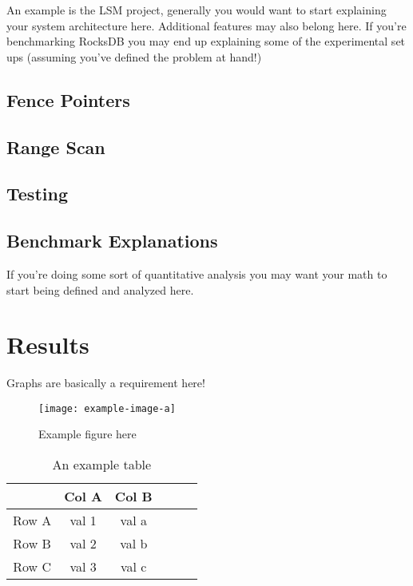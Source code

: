 \documentclass[sigconf]{acmart}
\begin{document}
An example is the LSM project, generally you would want to start explaining
your system architecture here. Additional features may also belong here. If
you're benchmarking RocksDB you may end up explaining some of the experimental
set ups (assuming you've defined the problem at hand!)

\subsection{Fence Pointers}

\subsection{Range Scan}

\subsection{Testing}

\subsection{Benchmark Explanations}

If you're doing some sort of quantitative analysis you may want your math to 
start being defined and analyzed here.


\section{Results}
Graphs are basically a requirement here!

\begin{figure}[ht]
    \texttt{[image: example-image-a]}
    \caption{Example figure here}
    \label{fig:filler}
\end{figure}

\begin{table}[H]
    \caption{An example table}
    \label{tab:ex}
    \centering

    \begin{tabular}{c |c c c c c}
        \hline\hline
        & Col A & Col B \\
        \hline
        Row A & val 1 & val a \\
        Row B & val 2 & val b \\
        Row C & val 3 & val c \\
    \hline
    \end{tabular}
\end{table}
\end{document}
